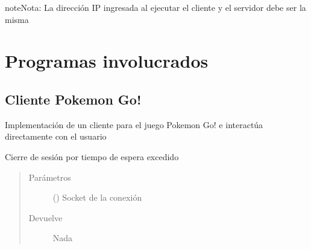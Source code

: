 \documentclass[letterpaper,10pt,spanish,openany,oneside]{sphinxmanual}
\begin{document}
\begin{sphinxadmonition}{note}{Nota:}
La dirección IP ingresada al ejecutar el cliente y el servidor debe ser la misma
\end{sphinxadmonition}


\chapter{Programas involucrados}
\label{\detokenize{index:programas-involucrados}}

\section{Cliente Pokemon Go!}
\label{\detokenize{pokemonClient:cliente-pokemon-go}}\label{\detokenize{pokemonClient::doc}}
Implementación de un cliente para el juego Pokemon Go! e interactúa directamente con el usuario

\label{\detokenize{pokemonClient:module-pokemonClient}}

\begin{fulllineitems}
\label{\detokenize{pokemonClient:pokemonClient.cerrarPorTimeout}}
Cierre de sesión por tiempo de espera excedido
\begin{quote}\begin{description}
\item[{Parámetros}] \leavevmode
{} () \textendash{} Socket de la conexión

\item[{Devuelve}] \leavevmode
Nada

\end{description}\end{quote}

\end{fulllineitems}

\end{document}
